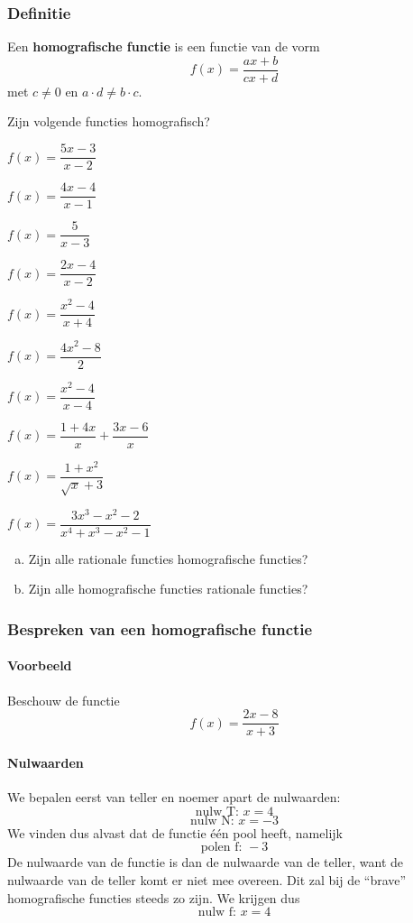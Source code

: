 \documentclass[12pt,twoside,a4paper]{article}
\begin{document}
\subsubsection{Definitie}
\begin{mdframed}
Een {\bf homografische functie} is een functie van de vorm
$$f(x)=\dfrac{ax+b}{cx+d}$$
met $c\neq 0$ en $a\cdot d\neq b\cdot c$.
\end{mdframed}

\begin{oefening}
Zijn volgende functies homografisch?
\begin{exlist}{2}
  \item $f(x)=\dfrac{5x-3}{x-2}$
  \item $f(x)=\dfrac{4x-4}{x-1}$
  \item $f(x)=\dfrac{5}{x-3}$
  \item $f(x)=\dfrac{2x-4}{x-2}$
  \item $f(x)=\dfrac{x^2-4}{x+4}$
  \item $f(x)=\dfrac{4x^2-8}{2}$
  \item $f(x)=\dfrac{x^2-4}{x-4}$
  \item $f(x)=\dfrac{1+4x}{x}+\dfrac{3x-6}{x}$
  \item $f(x)=\dfrac{1+x^2}{\sqrt{x}+3}$
  \item $f(x)=\dfrac{3x^3-x^2-2}{x^4+x^3-x^2-1}$
\end{exlist}
\end{oefening}

\begin{oefening}
\begin{enumerate}[(a)]
  \item Zijn alle rationale functies homografische functies?
  \item Zijn alle homografische functies rationale functies?
\end{enumerate}
\end{oefening}

\subsubsection{Bespreken van een homografische functie}

\paragraph{Voorbeeld} Beschouw de functie
$$f(x)=\dfrac{2x-8}{x+3}$$

\paragraph{Nulwaarden} We bepalen eerst van teller en noemer apart de
nulwaarden:
$$\text{nulw T: } x=4$$
$$\text{nulw N: } x=-3$$
We vinden dus alvast dat de functie één pool heeft, namelijk
$$\text{polen f: } -3$$
De nulwaarde van de functie is dan de nulwaarde van de teller, want de
nulwaarde van de teller komt er niet mee overeen. Dit zal bij de
``brave'' homografische functies steeds zo zijn. We krijgen dus
$$\text{nulw f: } x=4$$
\end{document}

